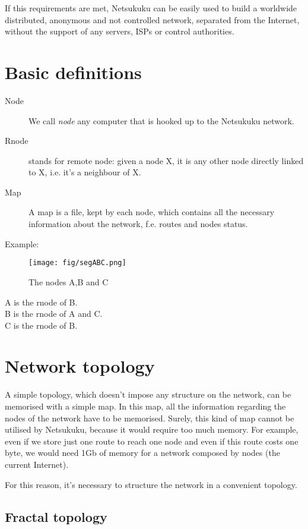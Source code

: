 \documentclass[a4paper]{article}
\begin{document}
If this requirements are met, Netsukuku can be easily used to build a worldwide
distributed, anonymous and not controlled network, separated from the
Internet, without the support of any servers, ISPs or control authorities.

\section{Basic definitions}

\begin{description}
	\item[Node] We call \emph{node} any computer that is hooked up to the
		Netsukuku network.
	\item[Rnode] stands for remote node: given a node X, it is any other
		node directly linked to X, i.e. it's a neighbour of X.
	\item[Map] A map is a file, kept by each node, which contains all the
		necessary information about the network, f.e. routes and nodes
		status.
\end{description}
Example:\\
\begin{figure}[h]
	\begin{center}
		\texttt{[image: fig/segABC.png]}
	\end{center}
	\caption{The nodes A,B and C}
\end{figure}
A is the rnode of B.\\
B is the rnode of A and C.\\
C is the rnode of B.

\section{Network topology}
\label{sec:net_topology}

A simple topology, which doesn't impose any structure on the network, can be
memorised with a simple map. In this map, all the information regarding the
nodes of the network have to be memorised. Surely, this kind of map cannot be
utilised by Netsukuku, because it would require too much memory.
For example, even if we store just one route to reach one node and even if
this route costs one byte, we would need 1Gb of memory for a network composed
by  nodes (the current Internet).

For this reason, it's necessary to structure the network in a convenient
topology.

\subsection{Fractal topology}
\label{sec:fractal_topology}
\end{document}
